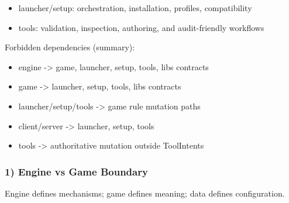 \documentclass[9pt,a4paper,openany]{book}
\begin{document}
\begin{itemize}
\item launcher/\allowbreak{}setup: orchestration, installation, profiles, compatibility
\end{itemize}


\begin{itemize}
\item tools: validation, inspection, authoring, and audit-\allowbreak{}friendly workflows
\end{itemize}





Forbidden dependencies (summary):



\begin{itemize}
\item engine -\allowbreak{}> game, launcher, setup, tools, libs contracts
\end{itemize}


\begin{itemize}
\item game -\allowbreak{}> launcher, setup, tools, libs contracts
\end{itemize}


\begin{itemize}
\item launcher/\allowbreak{}setup/\allowbreak{}tools -\allowbreak{}> game rule mutation paths
\end{itemize}


\begin{itemize}
\item client/\allowbreak{}server -\allowbreak{}> launcher, setup, tools
\end{itemize}


\begin{itemize}
\item tools -\allowbreak{}> authoritative mutation outside ToolIntents
\end{itemize}





\subsubsection{1) Engine vs Game Boundary}


Engine defines mechanisms; game defines meaning; data defines configuration.\allowbreak{}
\end{document}

